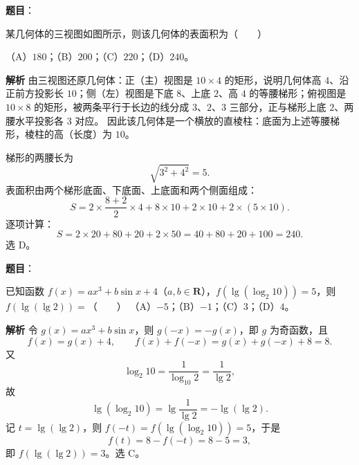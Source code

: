 \begin{answer}

\textbf{题目}：

某几何体的三视图如图所示，则该几何体的表面积为\mbox{（　　）}
\nopagebreak[4]
\begin{center}\end{center}
\nopagebreak[4]
（A）$180$；（B）$200$；（C）$220$；（D）$240$。

\textbf{解析}
由三视图还原几何体：正（主）视图是 $10\times4$ 的矩形，说明几何体高 $4$、沿正前方投影长 $10$；侧（左）视图是下底 $8$、上底 $2$、高 $4$ 的等腰梯形；俯视图是 $10\times8$ 的矩形，被两条平行于长边的线分成 $3$、$2$、$3$ 三部分，正与梯形上底 $2$、两腰水平投影各 $3$ 对应。
因此该几何体是一个横放的直棱柱：底面为上述等腰梯形，棱柱的高（长度）为 $10$。

梯形的两腰长为
\nopagebreak[4]
\[\sqrt{3^2+4^2}=5.\]
表面积由两个梯形底面、下底面、上底面和两个侧面组成：
\nopagebreak[4]
\[S=2\times\frac{8+2}2\times4+8\times10+2\times10+2\times(5\times10).\]
逐项计算：
\nopagebreak[4]
\[S=2\times20+80+20+2\times50=40+80+20+100=240.\]
选 D。


\end{answer}
\begin{answer}

\textbf{题目}：

已知函数 $f(x)=ax^3+b\sin x+4$（$a,b\in\mathbf R$），$f(\lg(\log_2 10))=5$，则 $f(\lg(\lg 2))=$\mbox{（　　）}
（A）$-5$；（B）$-1$；（C）$3$；（D）$4$。

\textbf{解析}
令 $g(x)=ax^3+b\sin x$，则 $g(-x)=-g(x)$，即 $g$ 为奇函数，且
\nopagebreak[4]
\[f(x)=g(x)+4,\qquad f(x)+f(-x)=g(x)+g(-x)+8=8.\]
又
\nopagebreak[4]
\[\log_2 10=\frac1{\log_{10}2}=\frac1{\lg2},\]
故
\nopagebreak[4]
\[\lg(\log_2 10)=\lg\frac1{\lg2}=-\lg(\lg2).\]
记 $t=\lg(\lg2)$，则 $f(-t)=f(\lg(\log_2 10))=5$，于是
\nopagebreak[4]
\[f(t)=8-f(-t)=8-5=3,\]
即 $f(\lg(\lg2))=3$。选 C。


\end{answer}
